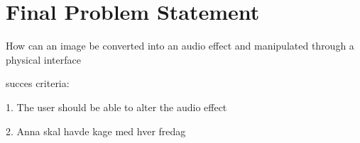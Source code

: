 \chapter{Final Problem Statement}\label{ch:finalproblem}

How can an image be converted into an audio effect and manipulated through a physical interface

succes criteria:

1. The user should be able to alter the audio effect 

2. Anna skal havde kage med hver fredag


